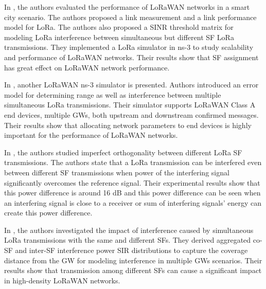 \documentclass[conference]{IEEEtran}
\begin{document}
\par In \cite{7996384}, the authors evaluated the performance of LoRaWAN networks in a smart city scenario. The authors proposed a link measurement and a link performance model for LoRa. The authors also proposed a SINR threshold matrix for modeling LoRa interference between simultaneous but different SF LoRa transmissions. They implemented a LoRa simulator in ns-3 to study scalability and performance of LoRaWAN networks. Their results show that SF assignment has great effect on LoRaWAN network performance.

\par In \cite{8090518}, another LoRaWAN ns-3 simulator is presented. Authors introduced an error model for determining range as well as interference between multiple simultaneous LoRa transmissions. Their simulator supports LoRaWAN Class A end devices, multiple GWs, both upstream and downstream confirmed messages. Their results show that allocating network parameters to end devices is highly important for the performance of LoRaWAN networks.

\par In \cite{8267219}, the authors studied imperfect orthogonality between different LoRa SF transmissions. The authors state that a LoRa transmission can be interfered even between different SF transmissions when power of the interfering signal significantly overcomes the reference signal. Their experimental results show that this power difference is around 16 dB and this power difference can be seen when an interfering signal is close to a receiver or sum of interfering signals' energy can create this power difference.

\par In \cite{8430542}, the authors investigated the impact of interference caused by simultaneous LoRa transmissions with the same and different SFs. They derived aggregated co-SF and inter-SF interference power SIR distributions to capture the coverage distance from the GW for modeling interference in multiple GWs scenarios. Their results show that transmission among different SFs can cause a significant impact in high-density LoRaWAN networks.
\end{document}

